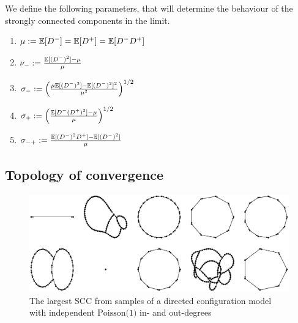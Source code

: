 We define the following parameters, that will determine the behaviour of the strongly connected components in the limit.
\begin{enumerate}
    \item $\mu:={\mathbb E}[D^-]={\mathbb E}[D^+]={\mathbb E}[D^-D^+]$
    \item $\nu_-:=\frac{{\mathbb E}[(D^-)^2]-\mu}{\mu}$ 
    \item $\sigma_-:=\left(\frac{\mu{\mathbb E}[(D^-)^3]-{\mathbb E}[(D^-)^2]^2}{\mu^2}\right)^{1/2}$ 
    \item $\sigma_+:=\left(\frac{{\mathbb E}[D^-(D^+)^2]-\mu}{\mu}\right)^{1/2}$ 
    \item $\sigma_{-+}:=\frac{{\mathbb E}[(D^-)^2D^+]-{\mathbb E}[(D^-)^2]}{\mu}$ 
\end{enumerate}
\subsection{Topology of convergence}

\begin{figure}[htbp]
    \centering

    \includegraphics[width=\textwidth]{Content/Pictures/largest_sccs.eps}
    
    \caption{The largest SCC from samples of a directed configuration model with independent $\text{Poisson(1)}$ in- and out-degrees}
    \label{fig:largest-sccs}
\end{figure}

